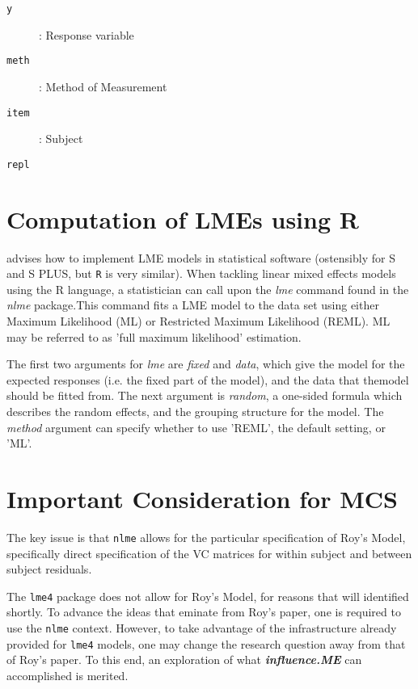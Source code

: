 \documentclass[12pt, a4paper]{report}
\theoremstyle{plain}
\theoremstyle{definition}
\theoremstyle{remark}
\begin{document}
	\begin{description}
		\item[\texttt{y}] : Response variable
		\item[\texttt{meth}] : Method of Measurement
		\item[\texttt{item}] : Subject
		\item[\texttt{repl}] 
	\end{description}

\section{Computation of LMEs using R} 

\cite{PB} advises how to
implement LME models in statistical software (ostensibly for S and
S PLUS, but \texttt{R} is very similar). When tackling linear mixed effects
models using the R language, a statistician can call upon the
\emph{lme} command found in the \emph{nlme} package.This command
fits a LME model to the data set using either Maximum Likelihood
(ML) or Restricted Maximum Likelihood (REML). ML may be referred
to as 'full maximum likelihood' estimation.

The first two arguments for \emph{lme} are \emph{fixed} and
\emph{data}, which give the model for the expected responses (i.e.
the fixed part of the model), and the data that themodel should be
fitted from. The next argument is  \emph{random}, a one-sided
formula which describes the random effects, and the grouping
structure for the model. The  \emph{method} argument can specify
whether to use 'REML', the default setting, or 'ML'.





	\section{Important Consideration for MCS}
	
	The key issue is that \texttt{nlme} allows for the particular specification of Roy's Model, specifically direct specification of the VC matrices for within subject and between subject residuals.
	
	The \texttt{lme4} package does not allow for Roy's Model, for reasons that will identified shortly.
	To advance the ideas that eminate from Roy's paper, one is required to use the \texttt{nlme} context. However, to take advantage of the infrastructure already provided for \texttt{lme4} models, one may change the research question away from that of Roy's paper. 
	To this end, an exploration of what \textbf{\textit{influence.ME}} can accomplished is merited.
\end{document}
